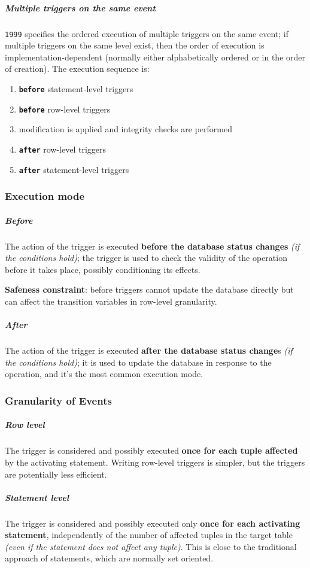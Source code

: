 \documentclass[english]{article}
\begin{document}
\subparagraph*{Multiple triggers on the same event}
\sql \texttt{1999} specifies the ordered execution of multiple triggers on the same event;
if multiple triggers on the same level exist, then the order of execution is implementation-dependent (normally either alphabetically ordered or in the order of creation).
The execution sequence is:

\begin{enumerate}
  \item \textbf{\texttt{before}} statement-level triggers
  \item \textbf{\texttt{before}} row-level triggers
  \item modification is applied and integrity checks are performed
  \item \textbf{\texttt{after}} row-level triggers
  \item \textbf{\texttt{after}} statement-level triggers
\end{enumerate}

\subsubsection{Execution mode}

\subparagraph*{Before}
The action of the trigger is executed \textbf{before the database status changes} \textit{(if the conditions hold)};
the trigger is used to check the validity of the operation before it takes place, possibly conditioning its effects.

\textbf{Safeness constraint}: before triggers cannot update the database directly but can affect the transition variables in row-level granularity.

\subparagraph*{After}

The action of the trigger is executed \textbf{after the database status change}s \textit{(if the conditions hold)};
it is used to update the database in response to the operation, and it's the most common execution mode.

\subsubsection{Granularity of Events}

\subparagraph*{Row level}
The trigger is considered and possibly executed \textbf{once for each tuple affected} by the activating statement.
Writing row-level triggers is simpler, but the triggers are potentially less efficient.

\subparagraph*{Statement level}
The trigger is considered and possibly executed only \textbf{once for each activating statement}, independently of the number of affected tuples in the target table \textit{(even if the statement does not affect any tuple)}.
This is close to the traditional approach of \sql statements, which are normally set oriented.
\end{document}
